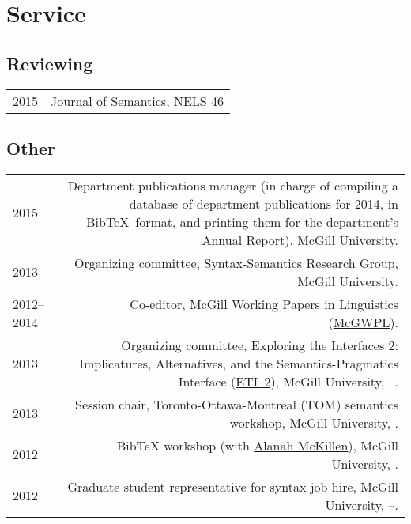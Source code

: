 \documentclass[10pt,letterpaper]{article}
\makeatletter
\newcommand{\formatdatenoday}[2]{\mydatenoday\formatdate{0}{#1}{#2}}
\newcommand{\myvrule}{\color{lightgray}\vrule width 1.0pt}
\newenvironment{cvsection}{%
  \renewcommand{\arraystretch}{1.60}
  \begin{longtable}[l]{@{} L R @{}}
}{%
  \end{longtable}
}
\makeatother
\begin{document}
\section*{Service}

\subsection*{Reviewing}

\begin{cvsection}
  2015 & Journal of Semantics, NELS 46
\end{cvsection}

\subsection*{Other}

\begin{cvsection}
  2015 & Department publications manager (in charge of compiling a database of
  department publications for 2014, in Bib\TeX\ format, and printing them for
  the department's Annual Report), McGill University. \\

  2013-- & Organizing committee, Syntax-Semantics Research Group, McGill
  University. \\

  2012--2014 & Co-editor, McGill Working Papers in Linguistics
  (\href{http://www.mcgill.ca/mcgwpl/}{McGWPL}). \\

  2013 & Organizing committee, Exploring the Interfaces 2: Implicatures,
  Alternatives, and the Semantics-Pragmatics Interface
  (\href{https://sites.google.com/site/eti2pragmatics/}{ETI~2}), McGill
  University, \shortmonthname[4]--\formatdatenoday{6}{2013}. \\

  2013 & Session chair, Toronto-Ottawa-Montreal (TOM) semantics workshop,
  McGill University, . \\


  2012 & Bib\TeX{} workshop (with
  \href{http://people.linguistics.mcgill.ca/~alanah.mckillen/}{Alanah
  McKillen}), McGill University, . \\

  2012 & Graduate student representative for syntax job hire, McGill
  University, \shortmonthname[5]--\formatdatenoday{6}{2012}. \\


\end{cvsection}
\end{document}
